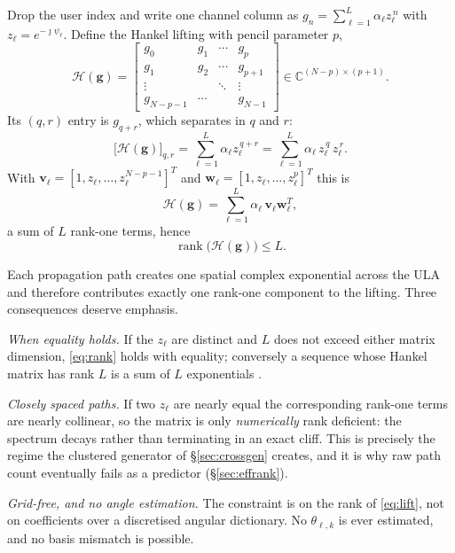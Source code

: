 \documentclass[journal]{IEEEtran}
\DeclareMathOperator{\rank}{rank}
\newcommand{\bg}{\mathbf{g}}
\newcommand{\bv}{\mathbf{v}}
\newcommand{\bw}{\mathbf{w}}
\newcommand{\Hank}{\mathcal{H}}
\newcommand{\jmathi}{\jmath}
\begin{document}
Drop the user index and write one channel column as
$g_n=\sum_{\ell=1}^{L}\alpha_\ell z_\ell^{\,n}$ with
$z_\ell=e^{-\jmathi\psi_\ell}$. Define the Hankel lifting with pencil parameter
$p$,
\begin{equation}\label{eq:lift}
\Hank(\bg)=
\begin{bmatrix}
g_0 & g_1 & \cdots & g_{p}\\
g_1 & g_2 & \cdots & g_{p+1}\\
\vdots & & \ddots & \vdots\\
g_{N-p-1} & \cdots & & g_{N-1}
\end{bmatrix}
\in\mathbb{C}^{(N-p)\times(p+1)}.
\end{equation}
Its $(q,r)$ entry is $g_{q+r}$, which separates in $q$ and $r$:
\begin{equation}\label{eq:sep}
\bigl[\Hank(\bg)\bigr]_{q,r}=\sum_{\ell=1}^{L}\alpha_\ell z_\ell^{\,q+r}
=\sum_{\ell=1}^{L}\alpha_\ell\,z_\ell^{\,q}\,z_\ell^{\,r}.
\end{equation}
With $\bv_\ell=[1,z_\ell,\dots,z_\ell^{N-p-1}]^{T}$ and
$\bw_\ell=[1,z_\ell,\dots,z_\ell^{p}]^{T}$ this is
\begin{equation}\label{eq:rank1}
\Hank(\bg)=\sum_{\ell=1}^{L}\alpha_\ell\,\bv_\ell\bw_\ell^{T},
\end{equation}
a sum of $L$ rank-one terms, hence
\begin{equation}\label{eq:rank}
\rank\bigl(\Hank(\bg)\bigr)\le L.
\end{equation}

Each propagation path creates one spatial complex exponential across the ULA
and therefore contributes exactly one rank-one component to the lifting. Three
consequences deserve emphasis.

\emph{When equality holds.} If the $z_\ell$ are distinct and $L$ does not
exceed either matrix dimension, \eqref{eq:rank} holds with equality; conversely
a sequence whose Hankel matrix has rank $L$ is a sum of $L$ exponentials
\cite{cadzow1988}.

\emph{Closely spaced paths.} If two $z_\ell$ are nearly equal the corresponding
rank-one terms are nearly collinear, so the matrix is only \emph{numerically}
rank deficient: the spectrum decays rather than terminating in an exact cliff.
This is precisely the regime the clustered generator of \S\ref{sec:crossgen}
creates, and it is why raw path count eventually fails as a predictor
(\S\ref{sec:effrank}).

\emph{Grid-free, and no angle estimation.} The constraint is on the rank of
\eqref{eq:lift}, not on coefficients over a discretised angular dictionary. No
$\theta_{\ell,k}$ is ever estimated, and no basis mismatch is possible.
\end{document}
